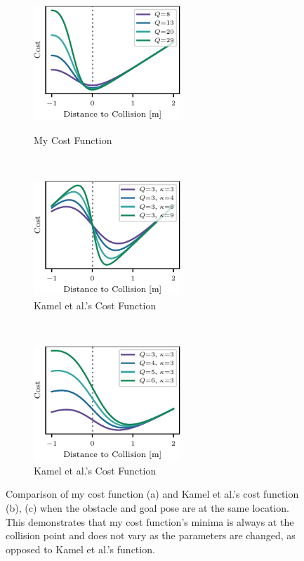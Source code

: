 \begin{figure}[h]
    \centering

    \begin{subfigure}[t]{0.33\textwidth}
        \centering
        \caption{My Cost Function}
        \includegraphics[height=1.7in]{figures/nmpc_cost_function_0.pdf}
        \label{fig:nmpc_cost_function-a}
    \end{subfigure}%
    ~
    \begin{subfigure}[t]{0.33\textwidth}
        \centering
        \caption{Kamel et al.'s Cost Function}
        \includegraphics[height=1.7in]{figures/nmpc_cost_function_1.pdf}
    \end{subfigure}%
    ~
    \begin{subfigure}[t]{0.33\textwidth}
        \centering
        \caption{Kamel et al.'s Cost Function}
        \includegraphics[height=1.7in]{figures/nmpc_cost_function_2.pdf}
    \end{subfigure}%

    \caption{Comparison of my cost function (a) and Kamel et al.'s cost function (b), (c) when the obstacle and goal pose are at the same location. This demonstrates that my cost function's minima is always at the collision point and does not vary as the parameters are changed, as opposed to Kamel et al.'s function.}
    \label{fig:nmpc_cost_function}
\end{figure}

